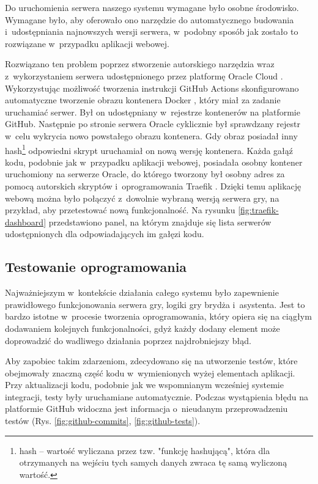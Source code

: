 Do uruchomienia serwera naszego systemu wymagane było
osobne środowisko. Wymagane było, aby oferowało ono
narzędzie do automatycznego budowania i~udostępniania
najnowszych wersji serwera, w~podobny sposób jak zostało
to rozwiązane w~przypadku aplikacji webowej.

Rozwiązano ten problem poprzez stworzenie autorskiego
narzędzia wraz z~wykorzystaniem serwera udostępnionego
przez platformę Oracle Cloud \cite{OracleCloud}.
Wykorzystując możliwość tworzenia instrukcji GitHub Actions
skonfigurowano automatyczne tworzenie obrazu kontenera
Docker \cite{Docker}, który miał za zadanie uruchamiać
serwer. Był on udostępniany w~rejestrze kontenerów na
platformie GitHub. Następnie po stronie serwera Oracle
cyklicznie był sprawdzany rejestr w~celu wykrycia
nowo powstałego obrazu kontenera. Gdy obraz posiadał
inny hash\footnote{hash -- wartość wyliczana przez tzw. "funkcję
  hashującą", która dla otrzymanych na wejściu tych
  samych danych zwraca tę samą wyliczoną wartość.}
odpowiedni skrypt uruchamiał on nową wersję kontenera.
Każda gałąź kodu, podobnie jak w~przypadku aplikacji
webowej, posiadała osobny kontener uruchomiony na serwerze
Oracle, do którego tworzony był osobny adres za pomocą
autorskich skryptów i~oprogramowania Traefik \cite{Traefik}.
Dzięki temu aplikację webową można było połączyć
z~dowolnie wybraną wersją serwera gry, na przykład, aby
przetestować nową funkcjonalność. Na rysunku
\ref{fig:traefik-dashboard} przedstawiono panel, na którym
znajduje się lista serwerów udostępnionych dla
odpowiadających im gałęzi kodu.

\FloatBarrier


\subsection{Testowanie oprogramowania}

Najważniejszym w~kontekście działania całego systemu
było zapewnienie prawidłowego funkcjonowania
serwera gry, logiki gry brydża i~asystenta.
Jest to bardzo istotne w~procesie tworzenia oprogramowania,
który opiera się na ciągłym dodawaniem kolejnych
funkcjonalności, gdyż każdy dodany element może doprowadzić
do wadliwego działania poprzez najdrobniejszy błąd.

Aby zapobiec takim zdarzeniom, zdecydowano się na utworzenie
testów, które obejmowały znaczną część kodu w~wymienionych
wyżej elementach aplikacji. Przy aktualizacji kodu,
podobnie jak we wspomnianym wcześniej systemie integracji,
testy były uruchamiane automatycznie. Podczas wystąpienia
błędu na platformie GitHub widoczna jest informacja
o~nieudanym przeprowadzeniu testów
(Rys. \ref{fig:github-commits}, \ref{fig:github-tests}).

